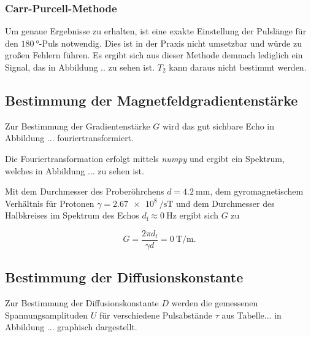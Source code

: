 \subsubsection{Carr-Purcell-Methode}

Um genaue Ergebnisse zu erhalten, ist eine exakte Einstellung der Pulslänge für den $\SI{180}{\degree}$-Puls notwendig. Dies ist 
in der Praxis nicht umsetzbar und würde zu großen Fehlern führen. Es ergibt sich aus dieser Methode demnach lediglich ein Signal,
das in Abbildung .. zu sehen ist. $T_2$ kann daraus nicht bestimmt werden.  

\subsection{Bestimmung der Magnetfeldgradientenstärke}

Zur Bestimmung der Gradientenstärke $G$ wird das gut sichbare Echo in Abbildung ... fouriertransformiert.

Die Fouriertransformation erfolgt mittels \textit{numpy}\cite{numpy} und ergibt ein Spektrum, welches in Abbildung ... zu sehen ist. 

Mit dem Durchmesser des Proberöhrchens $d = \SI{4.2}{\milli\metre}$, dem gyromagnetischem Verhältnis für Protonen 
$\gamma = \SI{2.67e8}{\per\second\tesla}$ und dem Durchmesser des Halbkreises im Spektrum des Echos $d_\text{f} \approx \SI{0}{\hertz}$
ergibt sich $G$ zu 

\begin{equation*}
  G = \frac{2\pi d_\text{f}}{\gamma d} = \SI{0}{\tesla\per\metre}.
\end{equation*}

\subsection{Bestimmung der Diffusionskonstante}

Zur Bestimmung der Diffusionskonstante $D$ werden die gemessenen Spannungsamplituden $U$ für verschiedene Pulsabstände $\tau$ aus 
Tabelle... in Abbildung ... graphisch dargestellt.  

